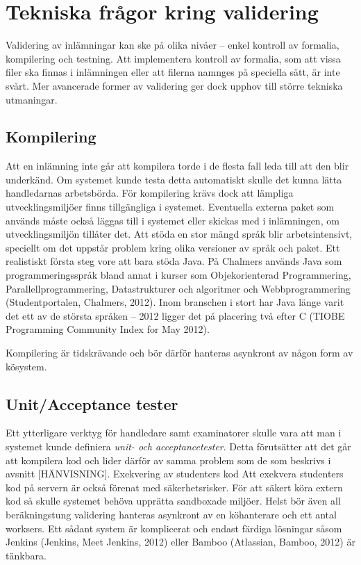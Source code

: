 \section{Tekniska frågor kring validering}

Validering av inlämningar kan ske på olika nivåer – enkel kontroll av formalia, kompilering och testning. 
Att implementera kontroll av formalia, som att vissa filer ska finnas i inlämningen eller att filerna namnges på speciella sätt, är inte svårt. Mer avancerade former av validering ger dock upphov till större tekniska utmaningar.

\subsection{Kompilering}

Att en inlämning inte går att kompilera torde i de flesta fall leda till att den blir underkänd. Om systemet kunde testa detta automatiskt skulle det kunna lätta handledarnas arbetsbörda.
För kompilering krävs dock att lämpliga utvecklingsmiljöer finns tillgängliga i systemet. Eventuella externa paket som används måste också läggas till i systemet eller skickas med i inlämningen, om utvecklingsmiljön tillåter det.
Att stöda en stor mängd språk blir arbetsintensivt, speciellt om det uppstår problem kring olika versioner av språk och paket.
Ett realistiskt första steg vore att bara stöda Java. På Chalmers används Java som programmeringsspråk bland annat i kurser som Objekorienterad Programmering, Parallellprogrammering, Datastrukturer och algoritmer och Webbprogrammering (Studentportalen, Chalmers, 2012). Inom branschen i stort har Java länge varit det ett av de största språken – 2012 ligger det på placering två efter C (TIOBE Programming Community Index for May 2012).

Kompilering är tidskrävande och bör därför hanteras asynkront av någon form av kösystem.

\subsection{Unit/Acceptance tester}
Ett ytterligare verktyg för handledare samt examinatorer skulle vara att man i systemet kunde definiera \emph{unit- och acceptancetester}. Detta förutsätter att det går att kompilera kod och lider därför av samma problem som de som beskrivs i avsnitt [HÄNVISNING].
Exekvering av studenters kod
Att exekvera studenters kod på servern är också förenat med säkerhetsrisker.
För att säkert köra extern kod så skulle systemet behöva upprätta sandboxade miljöer. Helst bör även all beräkningstung validering hanteras asynkront av en köhanterare och ett antal worksers. Ett sådant system är komplicerat och endast färdiga lösningar såsom Jenkins (Jenkins, Meet Jenkins, 2012) eller Bamboo (Atlassian, Bamboo, 2012) är tänkbara.

